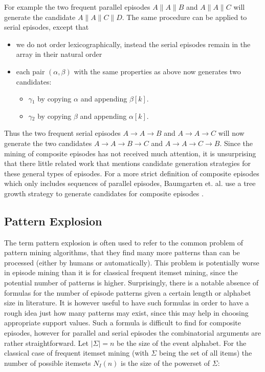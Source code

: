 For example the two frequent parallel episodes $A \| A \| B$ and $A \| A \| C$ will generate the candidate $A \| A \| C \| D$. \newline
The same procedure can be applied to serial episodes, except that
\begin{itemize}
	\item we do not order lexicographically, instead the serial episodes remain in the array in their natural order
	\item each pair $(\alpha , \beta )$ with the same properties as above now generates two candidates:
	\begin{itemize}
		\item $\gamma{_1}$ by copying $\alpha$ and appending $\beta [k]$.
		\item $\gamma{_2}$ by copying $\beta$ and appending $\alpha [k]$.
	\end{itemize}
\end{itemize}

Thus the two frequent serial episodes $A \rightarrow A \rightarrow B$ and $A \rightarrow A \rightarrow C$ will now generate the two candidates $A \rightarrow A \rightarrow B \rightarrow C$ and $A \rightarrow A \rightarrow C \rightarrow B$. \newline
Since the mining of composite episodes has not received much attention, it is unsurprising that there little related work that mentions candidate generation strategies for these general types of episodes. For a more strict definition of composite episodes which only includes sequences of parallel episodes, Baumgarten et. al. use a tree growth strategy to generate candidates for composite episodes \cite{baumgarten2003tree}. 

\subsection{Pattern Explosion}
The term pattern explosion is often used to refer to the common problem of pattern mining algorithms, that they find many more patterns than can be processed (either by humans or automatically). This problem is potentially worse in episode mining than it is for classical frequent itemset mining, since the potential number of patterns is higher. Surprisingly, there is a notable absence of formulas for the number of episode patterns given a certain length or alphabet size in literature. It is however useful to have such formulas in order to have a rough idea just how many patterns may exist, since this may help in choosing appropriate support values. Such a formula is difficult to find for composite episodes, however for parallel and serial episodes the combinatorial arguments are rather straightforward. Let $|\Sigma| = n$ be the size of the event alphabet. For the classical case of frequent itemset mining (with $\Sigma$ being the set of all items) the number of possible itemsets $N_I(n)$ is the size of the powerset of $\Sigma$:

